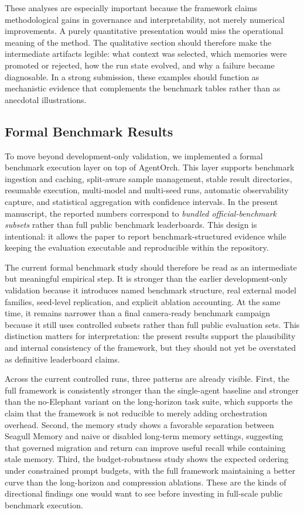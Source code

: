 \documentclass[a4paper,fleqn]{cas-sc}
\begin{document}
These analyses are especially important because the framework claims methodological gains in governance and interpretability, not merely numerical improvements. A purely quantitative presentation would miss the operational meaning of the method. The qualitative section should therefore make the intermediate artifacts legible: what context was selected, which memories were promoted or rejected, how the run state evolved, and why a failure became diagnosable. In a strong submission, these examples should function as mechanistic evidence that complements the benchmark tables rather than as anecdotal illustrations.

\subsection{Formal Benchmark Results}

To move beyond development-only validation, we implemented a formal benchmark execution layer on top of AgentOrch. This layer supports benchmark ingestion and caching, split-aware sample management, stable result directories, resumable execution, multi-model and multi-seed runs, automatic observability capture, and statistical aggregation with confidence intervals. In the present manuscript, the reported numbers correspond to \emph{bundled official-benchmark subsets} rather than full public benchmark leaderboards. This design is intentional: it allows the paper to report benchmark-structured evidence while keeping the evaluation executable and reproducible within the repository.

The current formal benchmark study should therefore be read as an intermediate but meaningful empirical step. It is stronger than the earlier development-only validation because it introduces named benchmark structure, real external model families, seed-level replication, and explicit ablation accounting. At the same time, it remains narrower than a final camera-ready benchmark campaign because it still uses controlled subsets rather than full public evaluation sets. This distinction matters for interpretation: the present results support the plausibility and internal consistency of the framework, but they should not yet be overstated as definitive leaderboard claims.

Across the current controlled runs, three patterns are already visible. First, the full framework is consistently stronger than the single-agent baseline and stronger than the no-Elephant variant on the long-horizon task suite, which supports the claim that the framework is not reducible to merely adding orchestration overhead. Second, the memory study shows a favorable separation between Seagull Memory and naive or disabled long-term memory settings, suggesting that governed migration and return can improve useful recall while containing stale memory. Third, the budget-robustness study shows the expected ordering under constrained prompt budgets, with the full framework maintaining a better curve than the long-horizon and compression ablations. These are the kinds of directional findings one would want to see before investing in full-scale public benchmark execution.
\end{document}
